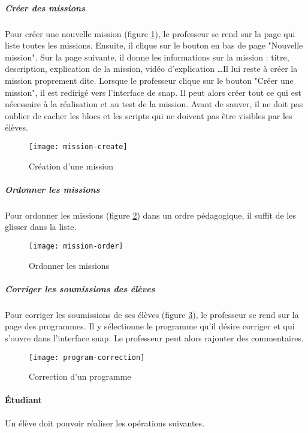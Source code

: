 \subparagraph{Créer des missions} Pour créer une nouvelle \gls{mission} (figure \ref{fig:mission-create}), le professeur se rend sur la page qui liste toutes les \glspl{mission}. Ensuite, il clique sur le bouton en bas de page "Nouvelle mission". Sur la page suivante, il donne les informations sur la \gls{mission} : titre, description, explication de la mission, vidéo d'explication \ldots Il lui reste à créer la mission proprement dite. Lorsque le professeur clique sur le bouton "Créer une \gls{mission}", il est redirigé vers l'interface de \gls{snap}. Il peut alors créer tout ce qui est nécessaire à la réalisation et au test de la mission. Avant de sauver, il ne doit pas oublier de cacher les \glspl{bloc} et les \glspl{script} qui ne doivent pas être visibles par les élèves.
\begin{figure}
  \begin{center}
    \texttt{[image: mission-create]}
    \caption{Création d'une mission}
    \label{fig:mission-create}
  \end{center}
\end{figure}

\subparagraph{Ordonner les missions} Pour ordonner les \glspl{mission} (figure \ref{fig:mission-order}) dans un ordre pédagogique, il suffit de les glisser dans la liste.
\begin{figure}
  \begin{center}
    \texttt{[image: mission-order]}
    \caption{Ordonner les missions}
    \label{fig:mission-order}
  \end{center}
\end{figure}

\subparagraph{Corriger les soumissions des élèves} Pour corriger les soumissions de ses élèves (figure \ref{fig:program-correction}), le professeur se rend sur la page des programmes. Il y sélectionne le programme qu'il désire corriger et qui s'ouvre dans l'interface \gls{snap}. Le professeur peut alors rajouter des commentaires.
\begin{figure}
  \begin{center}
    \texttt{[image: program-correction]}
    \caption{Correction d'un programme}
    \label{fig:program-correction}
  \end{center}
\end{figure}

\paragraph{Étudiant}
Un élève doit pouvoir réaliser les opérations suivantes.

